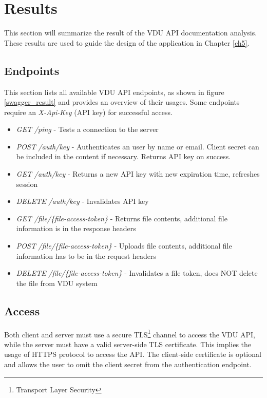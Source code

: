 \section{Results}
This section will summarize the result of the VDU API documentation analysis. These results are used to guide the design of the application in Chapter \ref{ch5}.

\subsection*{Endpoints}
This section lists all available VDU API endpoints, as shown in figure \ref{swagger_result} and provides an overview of their usages. Some endpoints require an \textit{X-Api-Key} (API key) for successful access.

\begin{itemize}
    \item \textit{GET} \textit{/ping} - Tests a connection to the server
    \item \textit{POST} \textit{/auth/key} - Authenticates an user by name or email. Client secret can be included in the content if necessary. Returns API key on success.
    \item \textit{GET} \textit{/auth/key} - Returns a new API key with new expiration time, refreshes session
    \item \textit{DELETE} \textit{/auth/key} - Invalidates API key
    \item \textit{GET} \textit{/file/\{file-access-token\}} - Returns file contents, additional file information is in the response headers
    \item \textit{POST} \textit{/file/\{file-access-token\}} - Uploads file contents, additional file information has to be in the request headers
    \item \textit{DELETE} \textit{/file/\{file-access-token\}} - Invalidates a file token, does NOT delete the file from VDU system
\end{itemize}

\subsection*{Access}
Both client and server must use a secure TLS\footnote{Transport Layer Security} channel to access the VDU API, while the server must have a valid server-side TLS certificate. This implies the usage of HTTPS protocol to access the API. The client-side certificate is optional and allows the user to omit the client secret from the authentication endpoint.

